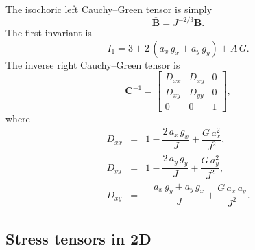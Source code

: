 \documentclass[11pt,a4paper]{article}
\begin{document}
%
The isochoric left Cauchy--Green tensor is simply
%
\begin{equation}
\boxed{\overline{\textbf{B}}=J^{-2/3}\textbf{B}}.
\end{equation}
%
The first invariant is
%
\begin{equation}
\boxed{I_1=3+2\,(a_x\,g_x+a_y\,g_y)+A\,G}.
\label{eq_I12D}
\end{equation}
%
The inverse right Cauchy--Green tensor is
%
\begin{equation}
\boxed{
\textbf{C}^{-1}=
\begin{bmatrix}
D_{xx}&D_{xy}&0\\
D_{xy}&D_{yy}&0\\
0&0&1
\end{bmatrix}
},
\end{equation}
%
where
%
\begin{eqnarray}
D_{xx}&=&1-\dfrac{2\,a_x\,g_x}{J}+\dfrac{G\,a_x^2}{J^2},\\
D_{yy}&=&1-\dfrac{2\,a_y\,g_y}{J}+\dfrac{G\,a_y^2}{J^2},\\
D_{xy}&=&-\dfrac{a_x\,g_y+a_y\,g_x}{J}+\dfrac{G\,a_x\,a_y}{J^2}.
\end{eqnarray}

\subsection{Stress tensors in 2D}
\end{document}
